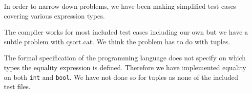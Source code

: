 \documentclass{article}
\begin{document}
In order to narrow down problems, we have been making simplified test cases covering various expression types.

The compiler works for most included test cases including our own but we have a subtle problem with qsort.cat. We think the problem has to do with tuples.


The formal specification of the programming language does not specify on which types the equality expression is defined. Therefore we have implemented equality on both {\tt int} and {\tt bool}. We have not done so for tuples as none of the included test files.
\end{document}
